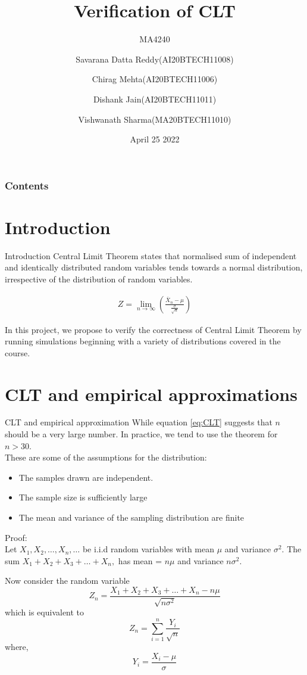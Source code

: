 \documentclass[10pt]{beamer}
\title{Verification of CLT}
\subtitle{MA4240}
\author[]{ Savarana Datta Reddy(AI20BTECH11008)  \and Chirag Mehta(AI20BTECH11006)
\and Dishank Jain(AI20BTECH11011) \and Vishwanath Sharma(MA20BTECH11010)}
\institute{IIT Hyderabad}
\date{April 25 2022}
\begin{document}
\frame{\titlepage}
\begin{frame}
\frametitle{Contents}
\tableofcontents
\end{frame}
\section{Introduction}
\begin{frame}{Introduction}
Central Limit Theorem states that normalised sum of independent and identically distributed random variables tends towards a normal distribution, irrespective of the distribution of random variables.
\begin{block}

\begin{align}
    Z = \lim_{n \to \infty} \left(\frac{\bar{X}_n-\mu}{\frac{\sigma}{\sqrt{n}}}\right) \label{eq:CLT}
\end{align}
\end{block}

In this project, we propose to verify the correctness of Central Limit Theorem by running simulations beginning with a variety of distributions covered in the course.
\end{frame}


\section{CLT and empirical approximations}
\begin{frame}{CLT and empirical approximation}
    While equation \eqref{eq:CLT} suggests that $n$ should be a very large number. In practice, we tend to use the theorem for $n>30$.\\
These are some of the assumptions for the distribution:
\begin{itemize}
\item  The samples drawn are independent.
\item  The sample size is sufficiently large
\item  The mean and variance of the sampling distribution are finite
\end{itemize}
\end{frame}
\begin{frame}{}
Proof:\\
Let $X_1,X_2,\dots,X_n,\dots$ be i.i.d random variables with mean $\mu$ and variance $\sigma^2$.
The sum $X_1+X_2+X_3+\dots+X_n,$ has mean = $n\mu$ and variance $n\sigma^2$.

Now consider the random variable 
\begin{equation}
    Z_n = \frac{X_1+X_2+X_3+\dots+X_n - n\mu}{\sqrt{n\sigma^2}}
\end{equation}
which is equivalent to 
\begin{equation}
    Z_n = \sum_{i=1}^n \frac{Y_i}{\sqrt{n}}
\end{equation}
where,
\begin{equation}
    Y_i = \frac{X_i-\mu}{\sigma}\label{a}
\end{equation}
\end{frame}
\end{document}
